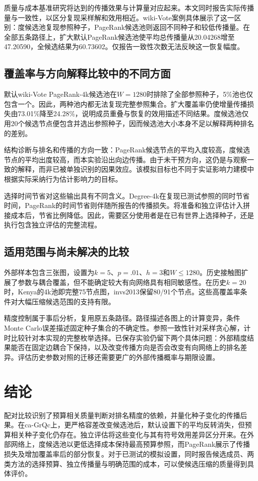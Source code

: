 \documentclass[smallextended]{svjour3}
\begin{document}
质量与成本基准研究将达到的传播效果与计算量对应起来\cite{ref16}。本文同时报告实际传播量与一致性，以区分复现采样解和效用相近。wiki-Vote案例具体展示了这一区别：度候选池复现参照种子，PageRank候选池则返回不同种子和较低传播量。在全部五条路径上，扩大默认PageRank候选池使平均总传播量从20.04268增至47.20590，全候选结果为60.73602。仅报告一致性次数无法反映这一恢复幅度。

\subsection{覆盖率与方向解释比较中的不同方面}
默认wiki-Vote PageRank-4k候选池在$W=1280$时排除了全部参照种子，5\%池也仅包含一个。因此，两种池内都无法复现完整参照集合。扩大覆盖率仍使增量传播损失由73.01\%降至24.28\%，说明成员重叠与恢复的效用描述不同结果。度候选池仅用20个候选节点便包含并选出参照种子，因而候选池大小本身不足以解释两种排名的差别。

结构诊断与排名和传播的方向一致：PageRank候选节点的平均入度较高，度候选节点的平均出度较高，而本实验沿出向边传播。由于未干预方向，这仍是与观察一致的解释，而非已被单独识别的因果效应。该模拟目标也不同于实证影响力建模中根据实际采纳行为估计影响力的目标\cite{ref15}。

选择时间节省对这些输出具有不同含义。Degree-4k在复现已测试参照的同时节省时间，PageRank的时间节省则伴随所报告的传播损失。将准备和独立评估计入拼接成本后，节省比例降低。因此，需要区分使用者是在已有世界上选择种子，还是执行包含独立评估的完整流程。

\subsection{适用范围与尚未解决的比较}
外部样本包含三张图，设置为$k=5$、$p=.01$、$h=3$和$W\le1280$。历史接触图扩展了参数与耦合覆盖，但不能确定较大有向网络具有相同敏感性。在历史$k=20$时，Kenya的4k池即完整75节点图，invs2013保留80/91个节点。这些高覆盖率条件对大幅压缩候选范围的支持有限。

精度控制属于事后分析，复用原五条路径。路径描述各图上的计算变异，条件Monte Carlo误差描述固定种子集合的不确定性。参照一致性针对采样贪心解，计时比较针对本实现的完整枚举选择。已保存实验仍留下两个具体问题：外部精度结果能否在固定边耦合下保持，以及改变传播方向是否会改变有向网络上的排名差异。评估历史参数对照的迁移还需要更广的外部传播概率与期限设置。

\section{结论}
配对比较识别了预算相关质量判断对排名精度的依赖，并量化种子变化的传播后果。在ca-GrQc上，更严格容差改变候选池后，默认设置下的平均反转消失，但预算相关种子变化仍存在。独立评估将这些变化与其有符号效用差异区分开来。在外部网络上，度候选池以更低选择成本保持最高预算参照，而PageRank展示了传播损失及增加覆盖率后的部分恢复。对于已测试的模拟设置，同时报告候选成员、两类方法的选择预算、独立传播量与明确范围的成本，可以使候选压缩的质量得到具体评价。
\end{document}
